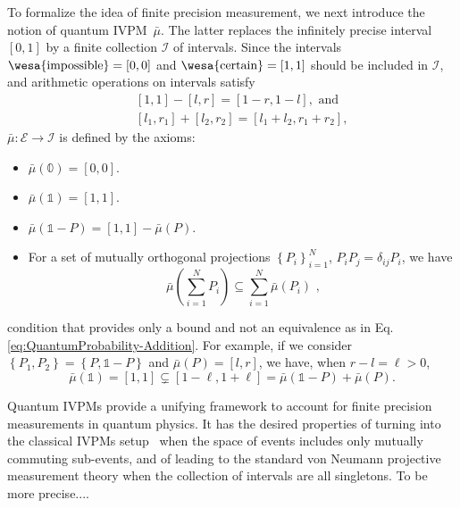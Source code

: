 \documentclass[english,reprint, aps, prl,superscriptaddress, showpacs,
showkeys, longbibliography, amsmath, amssymb]{revtex4-1}
\theoremstyle{plain}
\theoremstyle{definition}
\newcommand{\events}{\ensuremath{\mathcal{E}}}
\newcommand{\imposs}{{\text{\wesa{impossible}}}}
\newcommand{\necess}{{\text{\wesa{certain}}}}
\begin{document}
To formalize the idea of finite precision measurement, we next introduce 
the notion of quantum IVPM~$\bar{\mu}$. The latter replaces 
the infinitely precise interval $[0,1]$ by a finite collection $\mathscr{I}$ of
intervals. Since the intervals $\imposs=\left[0,0\right]$ and $\necess=\left[1,1\right]$ 
should be included in $\mathscr{I}$, and arithmetic operations on intervals satisfy
\begin{subequations}\label{eq:interval-operations}
\begin{eqnarray}
 &  & \left[1,1\right]-\left[l,r\right]=\left[1-r,1-l\right], \textrm{ and}\\
 &  & [l_{1},r_{1}]+[l_{2},r_{2}]=[l_{1}+l_{2},r_{1}+r_{2}] ,
\end{eqnarray}
\end{subequations}
$\bar{\mu}:\events\rightarrow\mathscr{I}$ is defined by the axioms:
\begin{itemize}
\item $\bar{\mu}(\mathbb{0})=\left[0,0\right]$. 
\item $\bar{\mu}(\mathbb{1})=\left[1,1\right]$. 
\item $\bar{\mu}\left(\mathbb{1}-P\right)=\left[1,1\right]-\bar{\mu}\left(P\right)$. 
\item For a set of mutually orthogonal projections $\left\{ P_{i}\right\} _{i=1}^{N}$,
$P_{i}P_{j}=\delta_{ij}P_{i}$, we have 
\begin{equation}
\bar{\mu}\left(\sum_{i=1}^{N}P_{i}\right)\subseteq\sum_{i=1}^{N}\bar{\mu}\left(P_{i}\right)\textrm{ ,}\label{eq:QuantumInterval-valuedProbability-Inclusion}
\end{equation}
\end{itemize}
condition that provides only a bound and not an equivalence as in Eq. 
\eqref{eq:QuantumProbability-Addition}. For
example, if we consider $\left\{ P_{1},P_{2}\right\} =\left\{ P,\mathbb{1}-P\right\} $
and $\bar{\mu}\left(P\right)=\left[l,r\right]$, we have, when $r-l=\ell>0$,
\[
\bar{\mu}(\mathbb{1})=\left[1,1\right]\subsetneq\left[1-\ell,1+\ell\right]=
\bar{\mu}\left(\mathbb{1}-P\right)+\bar{\mu}\left(P\right) .
\]

Quantum IVPMs provide a unifying framework to account for 
finite precision measurements in quantum physics. It has the desired 
properties of turning into the classical IVPMs setup~\cite{JamisonLodwick2004}
when the space of events includes only mutually commuting sub-events, and 
of leading to the standard von Neumann projective measurement theory when 
the collection of intervals are all singletons. To be more precise....
\end{document}
